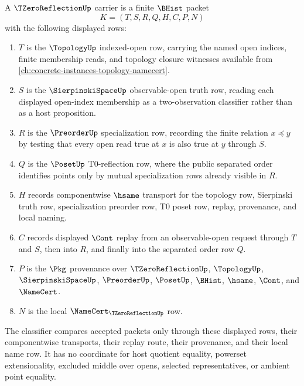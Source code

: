 \begin{definition}
\label{def:tzero-reflection-carrier}
A $\TZeroReflectionUp$ carrier is a finite $\BHist$ packet
$$
K=(T,S,R,Q,H,C,P,N)
$$
with the following displayed rows:
\begin{enumerate}
\item $T$ is the $\TopologyUp$ indexed-open row, carrying the named open indices, finite membership reads, and topology closure witnesses available from \autoref{ch:concrete-instances-topology-namecert}.
\item $S$ is the $\SierpinskiSpaceUp$ observable-open truth row, reading each displayed open-index membership as a two-observation classifier rather than as a host proposition.
\item $R$ is the $\PreorderUp$ specialization row, recording the finite relation $x \preceq y$ by testing that every open read true at $x$ is also true at $y$ through $S$.
\item $Q$ is the $\PosetUp$ T0-reflection row, where the public separated order identifies points only by mutual specialization rows already visible in $R$.
\item $H$ records componentwise $\hsame$ transport for the topology row, Sierpinski truth row, specialization preorder row, T0 poset row, replay, provenance, and local naming.
\item $C$ records displayed $\Cont$ replay from an observable-open request through $T$ and $S$, then into $R$, and finally into the separated order row $Q$.
\item $P$ is the $\Pkg$ provenance over $\TZeroReflectionUp$, $\TopologyUp$, $\SierpinskiSpaceUp$, $\PreorderUp$, $\PosetUp$, $\BHist$, $\hsame$, $\Cont$, and $\NameCert$.
\item $N$ is the local $\NameCert_{\TZeroReflectionUp}$ row.
\end{enumerate}
The classifier compares accepted packets only through these displayed rows, their componentwise transports, their replay route, their provenance, and their local name row. It has no coordinate for host quotient equality, powerset extensionality, excluded middle over opens, selected representatives, or ambient point equality.
\end{definition}


